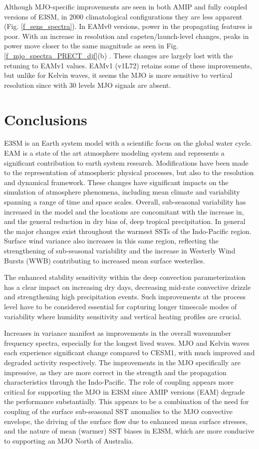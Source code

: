 \documentclass[draft,ms]{AGUTeX}
\begin{document}
\begin{article}
Although MJO-specific improvements are seen in both AMIP and fully coupled versions of E3SM, in 2000 climatological configurations they are less apparent (Fig. \ref{f_sens_spectra}). In EAMv0 versions, power in the propagating features is poor. With an increase in resolution and capeten/launch-level changes, peaks in power move closer to the same magnitude as seen in Fig. \ref{f_mjo_spectra_PRECT_djf}(b) . These changes are largely lost with the retuning to EAMv1 values. EAMv1 (v1L72) retains some of these improvements, but unlike for Kelvin waves, it seems the MJO is more sensitive to vertical resolution since with 30 levels MJO signals are absent.

\section{Conclusions}
\label{sec:conclusions}
E3SM is an Earth system model with a scientific focus on the global water cycle. EAM is a state of the art atmosphere modeling system and represents a significant contribution to earth system research. Modifications have been made to the representation of atmospheric physical processes, but also to the resolution and dynamical framework. These changes have significant impacts on the simulation of atmosphere phenomena, including mean climate and variability spanning a range of time and space scales. Overall, sub-seasonal variability has increased in the model and the locations are concomitant with the increase in, and the general reduction in dry bias of, deep tropical precipitation. In general the major changes exist throughout the warmest SSTs of the Indo-Pacific region. Surface wind variance also increases in this same region, reflecting the strengthening of sub-seasonal variability and the increase in Westerly Wind Bursts (WWB) contributing to increased mean surface westerlies.

The enhanced stability sensitivity within the deep convection parameterization has a clear impact on increasing dry days, decreasing mid-rate convective drizzle and strengthening high precipitation events. Such improvements at the process level have to be considered essential for capturing longer timescale modes of variability where humidity sensitivity and vertical heating profiles are crucial. 

Increases in variance manifest as improvements in the overall wavenumber frequency spectra, especially for the longest lived waves. MJO and Kelvin waves each experience significant change compared to CESM1, with much improved and degraded activity respectively. The improvements in the MJO specifically are impressive, as they are more correct in the strength and the propagation characteristics through the Indo-Pacific. The role of coupling appears more critical for supporting the MJO in E3SM since AMIP versions (EAM) degrade the performance substantially. This appears to be a combination of the need for coupling of the surface sub-seasonal SST anomalies to the MJO convective envelope, the driving of the surface flow due to enhanced mean surface stresses, and the nature of mean (warmer) SST biases in E3SM, which are more conducive to supporting an MJO North of Australia. 


\end{article}
\end{document}
